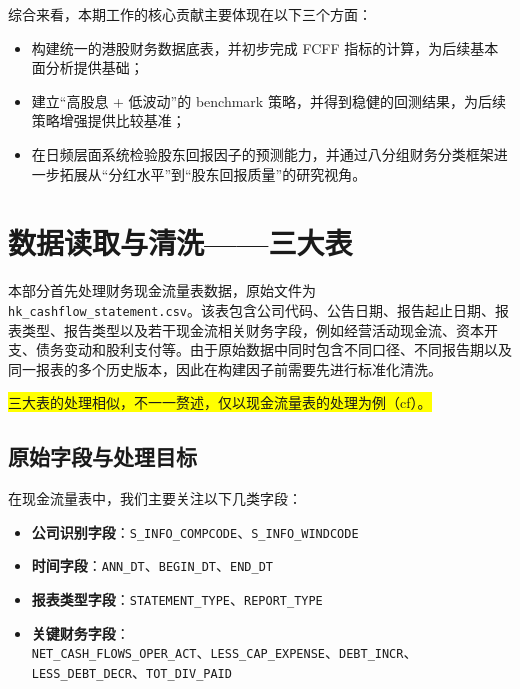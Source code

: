 \documentclass[a4paper,10pt]{article}
\begin{document}
综合来看，本期工作的核心贡献主要体现在以下三个方面：

\begin{itemize}

\item 构建统一的港股财务数据底表，并初步完成 FCFF 指标的计算，为后续基本面分析提供基础；

\item 建立“高股息 + 低波动”的 benchmark 策略，并得到稳健的回测结果，为后续策略增强提供比较基准；

\item 在日频层面系统检验股东回报因子的预测能力，并通过八分组财务分类框架进一步拓展从“分红水平”到“股东回报质量”的研究视角。

\end{itemize}











\section{数据读取与清洗——三大表}

本部分首先处理财务现金流量表数据，原始文件为 \texttt{hk\_cashflow\_statement.csv}。该表包含公司代码、公告日期、报告起止日期、报表类型、报告类型以及若干现金流相关财务字段，例如经营活动现金流、资本开支、债务变动和股利支付等。由于原始数据中同时包含不同口径、不同报告期以及同一报表的多个历史版本，因此在构建因子前需要先进行标准化清洗。

\colorbox{yellow}{三大表的处理相似，不一一赘述，仅以现金流量表的处理为例（cf）。}

\subsection{原始字段与处理目标}

在现金流量表中，我们主要关注以下几类字段：

\begin{itemize}
    \item \textbf{公司识别字段}：\texttt{S\_INFO\_COMPCODE}、\texttt{S\_INFO\_WINDCODE}
    \item \textbf{时间字段}：\texttt{ANN\_DT}、\texttt{BEGIN\_DT}、\texttt{END\_DT}
    \item \textbf{报表类型字段}：\texttt{STATEMENT\_TYPE}、\texttt{REPORT\_TYPE}
    \item \textbf{关键财务字段}：\\
    \texttt{NET\_CASH\_FLOWS\_OPER\_ACT}、\texttt{LESS\_CAP\_EXPENSE}、\texttt{DEBT\_INCR}、\texttt{LESS\_DEBT\_DECR}、\texttt{TOT\_DIV\_PAID}
\end{itemize}
\end{document}
